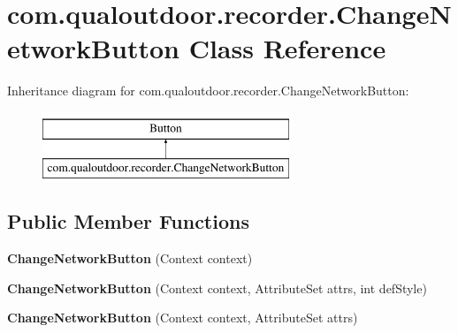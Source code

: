 \hypertarget{classcom_1_1qualoutdoor_1_1recorder_1_1ChangeNetworkButton}{\section{com.\-qualoutdoor.\-recorder.\-Change\-Network\-Button Class Reference}
\label{classcom_1_1qualoutdoor_1_1recorder_1_1ChangeNetworkButton}
}
Inheritance diagram for com.\-qualoutdoor.\-recorder.\-Change\-Network\-Button\-:\begin{figure}[H]
\begin{center}
\leavevmode
\includegraphics[height=2.000000cm]{classcom_1_1qualoutdoor_1_1recorder_1_1ChangeNetworkButton}
\end{center}
\end{figure}
\subsection*{Public Member Functions}
\begin{DoxyCompactItemize}
\item 
\hypertarget{classcom_1_1qualoutdoor_1_1recorder_1_1ChangeNetworkButton_a1ec861ea067b2f79202f8c2d10a8549b}{{\bfseries Change\-Network\-Button} (Context context)}\label{classcom_1_1qualoutdoor_1_1recorder_1_1ChangeNetworkButton_a1ec861ea067b2f79202f8c2d10a8549b}

\item 
\hypertarget{classcom_1_1qualoutdoor_1_1recorder_1_1ChangeNetworkButton_aa5a17b922a1d5b972f13b6c4574af988}{{\bfseries Change\-Network\-Button} (Context context, Attribute\-Set attrs, int def\-Style)}\label{classcom_1_1qualoutdoor_1_1recorder_1_1ChangeNetworkButton_aa5a17b922a1d5b972f13b6c4574af988}

\item 
\hypertarget{classcom_1_1qualoutdoor_1_1recorder_1_1ChangeNetworkButton_a0663b052f5164177b6c7e9de01183e35}{{\bfseries Change\-Network\-Button} (Context context, Attribute\-Set attrs)}\label{classcom_1_1qualoutdoor_1_1recorder_1_1ChangeNetworkButton_a0663b052f5164177b6c7e9de01183e35}

\end{DoxyCompactItemize}
